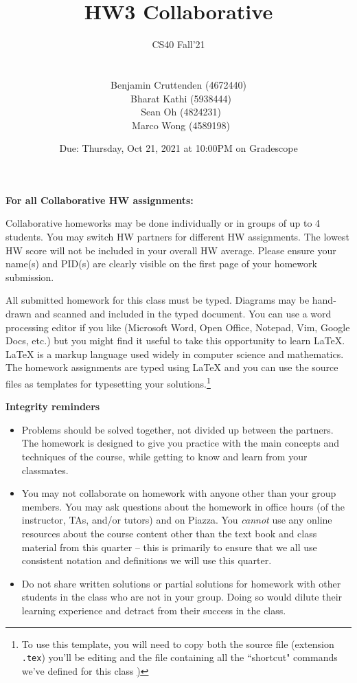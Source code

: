 \documentclass[12pt, oneside]{article}
\title{HW3 Collaborative}
\author{CS40 Fall'21\\\\\\
Benjamin Cruttenden (4672440)\\\
Bharat Kathi (5938444)\\\
Sean Oh (4824231)\\\
Marco Wong (4589198)}
\date{Due: Thursday, Oct 21, 2021 at 10:00PM on Gradescope}
\begin{document}
\maketitle

{\bf For all Collaborative HW assignments:}

Collaborative homeworks may be done individually or in groups of up to 4 students. You may switch HW partners for different HW assignments. The lowest HW score will not be included in your overall HW average. Please ensure your name(s) and PID(s) are clearly visible on the first page of your homework submission.

All submitted homework for this class must be typed. Diagrams may be hand-drawn and scanned and included in the typed document. You can use a word processing editor if you like (Microsoft Word, Open Office, Notepad, Vim, Google Docs, etc.) but you might find it useful to take this opportunity to learn LaTeX. LaTeX is a markup language used widely in computer science and mathematics. The homework assignments are typed using LaTeX and you can use the source files as templates for typesetting your solutions.\footnote{To use this template, you will need to copy both the source file (extension \texttt{.tex})  you'll be editing
and the file containing all the ``shortcut" commands we've defined for this class \href{https://drive.google.com/file/d/1FmQvgByKnNjTpIkAUw31TGWYrQZM-HK0/view?usp=sharing})}


{\bf Integrity reminders}
\begin{itemize}
\item Problems should be solved together, not divided up between the partners. The homework is
designed to give you practice with the main concepts and techniques of the course, while getting to know and learn from your classmates.
\item You may not collaborate on homework with anyone other than your group members.
You may ask questions about the homework in office hours (of the instructor, TAs, and/or tutors) and 
on Piazza.  You \emph{cannot} use any online resources about the course content other than the text
book and class material from this quarter -- this is primarily to ensure that we all use consistent notation and
definitions we will use this quarter.
\item Do not share written solutions or partial solutions for homework with other students in the class who are not in your group. Doing so would dilute their learning experience and detract from their success in the class.
\end{itemize}
\end{document}
